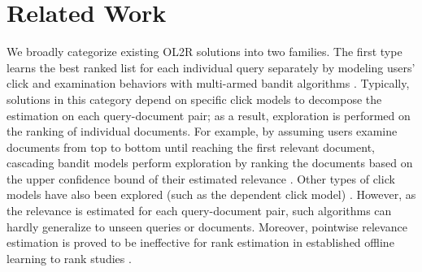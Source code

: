 \section{Related Work}

We broadly categorize existing OL2R solutions into two families.
The first type learns the best ranked list for each individual query separately by modeling users' click and examination behaviors with multi-armed bandit algorithms \cite{radlinski2008learning,kveton2015cascading,zoghi2017online,lattimore2018toprank}. 
Typically, solutions in this category depend on specific click models to decompose the estimation on each query-document pair; as a result, exploration is performed on the ranking of individual documents. For example, by assuming users examine documents from top to bottom until reaching the first relevant document,  cascading bandit models perform exploration by ranking the documents based on the upper confidence bound of their estimated relevance \cite{kveton2015cascading, kveton2015combinatorial, li2016contextual}. 
Other types of click models have also been explored (such as the dependent click model) \cite{katariya2016dcm,zoghi2017online, lattimore2018toprank, li2018online, kveton2018bubblerank}. 
However, as the relevance is estimated for each query-document pair, such algorithms can hardly generalize to unseen queries or documents. Moreover, pointwise relevance estimation is proved to be ineffective for rank estimation in established offline learning to rank studies \cite{chapelle2011yahoo,burges2010ranknet}.

